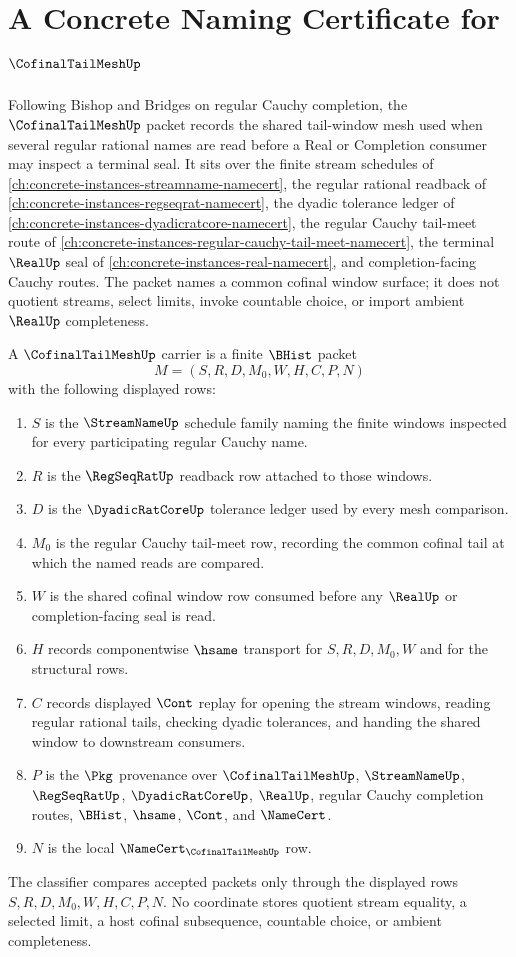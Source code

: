 \chapter{A Concrete Naming Certificate for $\CofinalTailMeshUp$}
\label{ch:concrete-instances-cofinal-tail-mesh-namecert}

Following Bishop and Bridges on regular Cauchy completion, the $\CofinalTailMeshUp$ packet records the shared tail-window mesh used when several regular rational names are read before a Real or Completion consumer may inspect a terminal seal. It sits over the finite stream schedules of \autoref{ch:concrete-instances-streamname-namecert}, the regular rational readback of \autoref{ch:concrete-instances-regseqrat-namecert}, the dyadic tolerance ledger of \autoref{ch:concrete-instances-dyadicratcore-namecert}, the regular Cauchy tail-meet route of \autoref{ch:concrete-instances-regular-cauchy-tail-meet-namecert}, the terminal $\RealUp$ seal of \autoref{ch:concrete-instances-real-namecert}, and completion-facing Cauchy routes. The packet names a common cofinal window surface; it does not quotient streams, select limits, invoke countable choice, or import ambient $\RealUp$ completeness.

\begin{definition}
\label{def:cofinal-tail-mesh-carrier}
A $\CofinalTailMeshUp$ carrier is a finite $\BHist$ packet
$$
M=(S,R,D,M_0,W,H,C,P,N)
$$
with the following displayed rows:
\begin{enumerate}
\item $S$ is the $\StreamNameUp$ schedule family naming the finite windows inspected for every participating regular Cauchy name.
\item $R$ is the $\RegSeqRatUp$ readback row attached to those windows.
\item $D$ is the $\DyadicRatCoreUp$ tolerance ledger used by every mesh comparison.
\item $M_0$ is the regular Cauchy tail-meet row, recording the common cofinal tail at which the named reads are compared.
\item $W$ is the shared cofinal window row consumed before any $\RealUp$ or completion-facing seal is read.
\item $H$ records componentwise $\hsame$ transport for $S,R,D,M_0,W$ and for the structural rows.
\item $C$ records displayed $\Cont$ replay for opening the stream windows, reading regular rational tails, checking dyadic tolerances, and handing the shared window to downstream consumers.
\item $P$ is the $\Pkg$ provenance over $\CofinalTailMeshUp$, $\StreamNameUp$, $\RegSeqRatUp$, $\DyadicRatCoreUp$, $\RealUp$, regular Cauchy completion routes, $\BHist$, $\hsame$, $\Cont$, and $\NameCert$.
\item $N$ is the local $\NameCert_{\CofinalTailMeshUp}$ row.
\end{enumerate}
The classifier compares accepted packets only through the displayed rows $S,R,D,M_0,W,H,C,P,N$. No coordinate stores quotient stream equality, a selected limit, a host cofinal subsequence, countable choice, or ambient completeness.
\end{definition}

